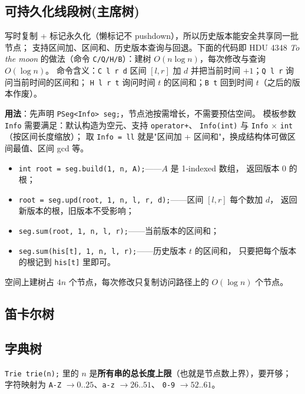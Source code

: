 \documentclass[11pt,a4paper,twocolumn]{ctexart}  %
\begin{document}
\subsection{可持久化线段树(主席树)}
写时复制 + 标记永久化（懒标记不 pushdown），所以历史版本能安全共享同一批节点；
支持区间加、区间和、历史版本查询与回退。下面的代码即 HDU 4348 \emph{To the moon}
的做法（命令 \texttt{C/Q/H/B}）：建树 $O(n\log n)$，每次修改与查询 $O(\log n)$。
命令含义：\texttt{C l r d} 区间 $[l,r]$ 加 $d$ 并把当前时间 $+1$；\texttt{Q l r} 询问当前时间的区间和；
\texttt{H l r t} 询问时间 $t$ 的区间和；\texttt{B t} 回到时间 $t$（之后的版本作废）。

\textbf{用法}：先声明 \texttt{PSeg<Info> seg;}，节点池按需增长，不需要预估空间。
模板参数 \texttt{Info} 需要满足：默认构造为空元、支持 \texttt{operator+}、
\texttt{Info(int)} 与 \texttt{Info} $\times$ \texttt{int}（按区间长度缩放）；
取 \texttt{Info = ll} 就是"区间加 + 区间和"，换成结构体可做区间最值、区间 gcd 等。
\begin{itemize}
    \item \texttt{int root = seg.build(1, n, A);}——$A$ 是 1-indexed 数组，
          返回版本 $0$ 的根；
    \item \texttt{root = seg.upd(root, 1, n, l, r, d);}——区间 $[l,r]$ 每个数加 $d$，
          返回新版本的根，旧版本不受影响；
    \item \texttt{seg.sum(root, 1, n, l, r);}——当前版本的区间和；
    \item \texttt{seg.sum(his[t], 1, n, l, r);}——历史版本 $t$ 的区间和，
          只要把每个版本的根记到 \texttt{his[t]} 里即可。
\end{itemize}
空间上建树占 $4n$ 个节点，每次修改只复制访问路径上的 $O(\log n)$ 个节点。


\subsection{笛卡尔树}


\subsection{字典树}
\texttt{Trie trie(n);} 里的 $n$ 是\textbf{所有串的总长度上限}（也就是节点数上界），要开够；
字符映射为 \texttt{A-Z} $\to 0..25$、\texttt{a-z} $\to 26..51$、
\texttt{0-9} $\to 52..61$。

\end{document}
